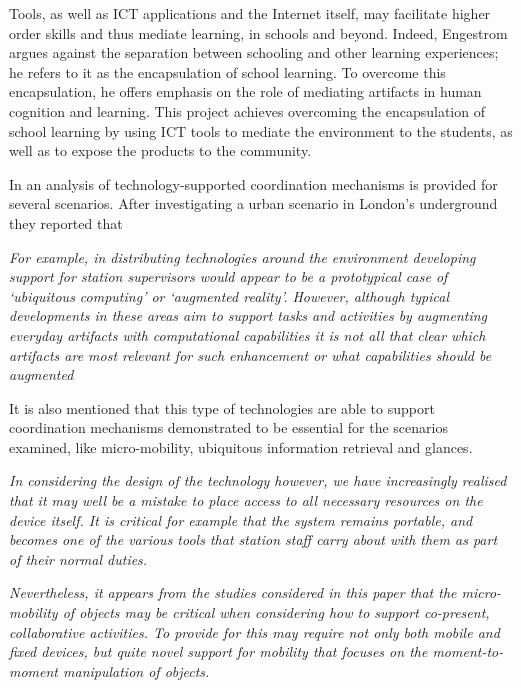Tools, as well as ICT applications and the Internet itself, may facilitate higher order skills and thus mediate learning, in schools and beyond\cite{kashdan_outdoors_2013}. Indeed, Engestrom\cite{engestrom_non_1991} argues against the separation between schooling and other learning experiences; he refers to it as the encapsulation of school learning. To overcome this encapsulation, he offers emphasis on the role of mediating artifacts in human cognition and learning.
This project achieves overcoming the encapsulation of school learning by using ICT tools to mediate the environment to the students, as well as to expose the products to the community\cite{kashdan_outdoors_2013}.

In \cite{luff_mobility_1998} an analysis of technology-supported coordination mechanisms is provided for several scenarios.
After investigating a urban scenario in London's underground they reported that 

\textit{For example, in distributing technologies around the environment developing support for station supervisors would appear to be a prototypical case of ‘ubiquitous computing’ or
‘augmented reality’. However, although typical developments in these areas aim to support tasks and activities by augmenting everyday artifacts with computational capabilities it is not all that clear which artifacts are most relevant for such enhancement or what capabilities should be augmented}

It is also mentioned that this type of technologies are able to support coordination mechanisms demonstrated to be essential for the scenarios examined, like micro-mobility, ubiquitous information retrieval and glances.

\textit{
In considering the design of the technology however, we have increasingly realised that it may well be a mistake to place access to all necessary resources on the device itself. It is critical for example that the system remains portable, and becomes one of the various tools that station staff carry about with them as part of their normal duties.}

\textit{Nevertheless, it appears from the studies considered in this paper that the micro-mobility of objects may be critical when considering how to support co-present, collaborative activities. To provide for this may require not only both mobile and fixed devices, but quite novel support for mobility that focuses on the moment-to-moment manipulation of objects.}

